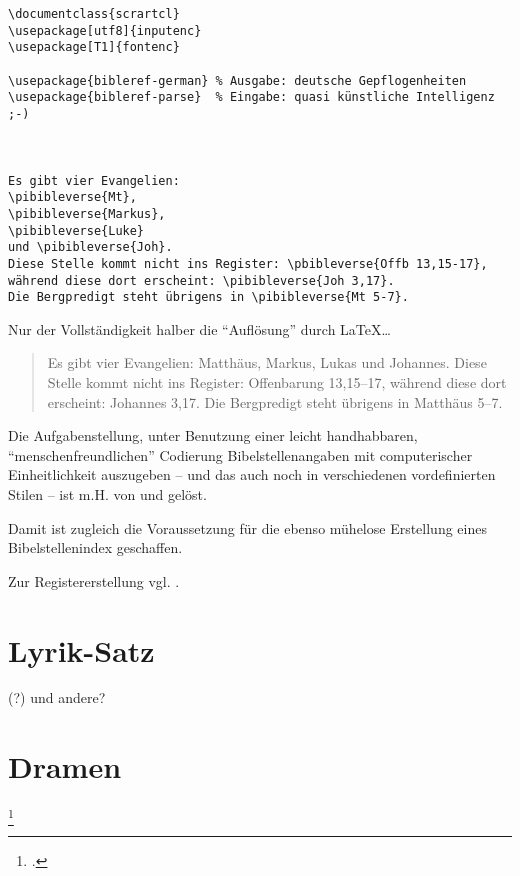 \begin{lstlisting}
\documentclass{scrartcl} 
\usepackage[utf8]{inputenc}
\usepackage[T1]{fontenc}

\usepackage{bibleref-german} % Ausgabe: deutsche Gepflogenheiten
\usepackage{bibleref-parse}  % Eingabe: quasi künstliche Intelligenz ;-)



Es gibt vier Evangelien: 
\pibibleverse{Mt}, 
\pibibleverse{Markus}, 
\pibibleverse{Luke} 
und \pibibleverse{Joh}. 
Diese Stelle kommt nicht ins Register: \pbibleverse{Offb 13,15-17}, 
während diese dort erscheint: \pibibleverse{Joh 3,17}. 
Die Bergpredigt steht übrigens in \pibibleverse{Mt 5-7}.

\end{lstlisting}


Nur der Vollständigkeit halber die \enquote{Auflösung} durch \LaTeX\ldots

\begin{quotation}
    Es gibt vier Evangelien: Matthäus, Markus, Lukas und Johannes. Diese Stelle kommt
    nicht ins Register: Offenbarung 13,15–17, während diese dort erscheint: Johannes 3,17.
    Die Bergpredigt steht übrigens in Matthäus 5–7.
\end{quotation}

Die Aufgabenstellung, unter Benutzung einer leicht handhabbaren, \enquote{menschenfreundlichen} Codierung
Bibelstellenangaben mit computerischer Einheitlichkeit auszugeben -- und das auch noch in verschiedenen
vordefinierten Stilen -- ist m.H. von  und  gelöst.

Damit ist zugleich die Voraussetzung für die ebenso mühelose Erstellung eines Bibelstellenindex geschaffen.

Zur Registererstellung vgl. .


\section{Lyrik-Satz}
 

 (?) und andere?

\section{Dramen}
\footcite[xxx]{lesetypografie}


